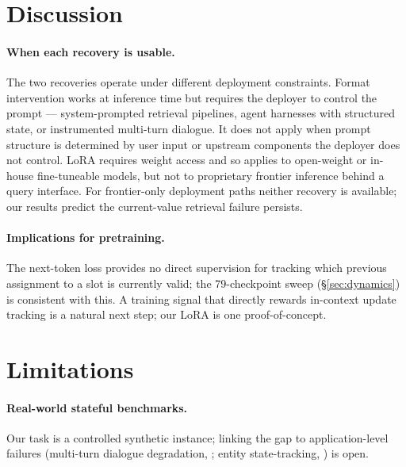 \documentclass[11pt]{article}
\begin{document}
\section{Discussion}
\label{sec:discussion}

\paragraph{When each recovery is usable.}
The two recoveries operate under different deployment constraints.
Format intervention works at inference time but requires the
deployer to control the prompt --- system-prompted retrieval
pipelines, agent harnesses with structured state, or instrumented
multi-turn dialogue. It does not apply when prompt structure is
determined by user input or upstream components the deployer does
not control.
LoRA requires weight access and so applies to open-weight or
in-house fine-tuneable models, but not to proprietary frontier
inference behind a query interface.
For frontier-only deployment paths neither recovery is available;
our results predict the current-value retrieval failure persists.

\paragraph{Implications for pretraining.}
The next-token loss provides no direct supervision for tracking
which previous assignment to a slot is currently valid; the
79-checkpoint sweep (\S\ref{sec:dynamics}) is consistent with this.
A training signal that directly rewards in-context update tracking
is a natural next step; our LoRA is one proof-of-concept.

\section*{Limitations}

\paragraph{Real-world stateful benchmarks.}
Our task is a controlled synthetic instance; linking the gap to
application-level failures (multi-turn dialogue degradation,
\citealp{laban2025multiturn}; entity state-tracking,
\citealp{rezaee2025state}) is open.
\end{document}
